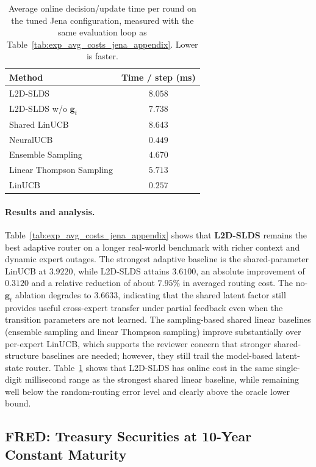 \begin{table}[ht]
\centering
\small
\setlength{\tabcolsep}{6pt}
\caption{Average online decision/update time per round on the tuned Jena configuration, measured with the
same evaluation loop as Table~\ref{tab:exp_avg_costs_jena_appendix}. Lower is faster.}
\label{tab:exp_runtime_jena_appendix}
\begin{tabular}{@{}lc@{}}
\toprule
Method & Time / step (ms) \\
\midrule
L2D-SLDS & \(8.058\) \\
L2D-SLDS w/o \(\mathbf{g}_t\) & \(7.738\) \\
Shared LinUCB & \(8.643\) \\
NeuralUCB & \(0.449\) \\
Ensemble Sampling & \(4.670\) \\
Linear Thompson Sampling & \(5.713\) \\
LinUCB & \(0.257\) \\
\bottomrule
\end{tabular}
\end{table}

\paragraph{Results and analysis.}
Table~\ref{tab:exp_avg_costs_jena_appendix} shows that \textbf{L2D-SLDS} remains the best adaptive
router on a longer real-world benchmark with richer context and dynamic expert outages. The strongest
adaptive baseline is the shared-parameter LinUCB at \(3.9220\), while L2D-SLDS attains \(3.6100\),
an absolute improvement of \(0.3120\) and a relative reduction of about \(7.95\%\) in averaged routing
cost. The no-\(\mathbf{g}_t\) ablation degrades to \(3.6633\), indicating that the shared latent factor
still provides useful cross-expert transfer under partial feedback even when the transition parameters
are not learned. The sampling-based shared linear baselines (ensemble sampling and linear Thompson
sampling) improve substantially over per-expert LinUCB, which supports the reviewer concern that
stronger shared-structure baselines are needed; however, they still trail the model-based latent-state
router. Table~\ref{tab:exp_runtime_jena_appendix} shows that L2D-SLDS has online cost in the same
single-digit millisecond range as the strongest shared linear baseline, while remaining well below the
random-routing error level and clearly above the oracle lower bound.


\subsection{FRED: Treasury Securities at 10-Year Constant Maturity}
\label{subsection_appendix_fred}

